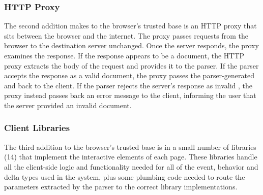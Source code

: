 \subsubsection{HTTP Proxy}
\label{future-web:implementation:proxy}
The second addition \CDF makes to the browser's trusted base is an HTTP proxy
that sits between the browser and the internet.  The proxy passes requests
from the browser to the destination server unchanged.  Once the server responds,
the proxy examines the response.  If the response appears to be a \CDF document,
the HTTP proxy extracts the body of the request and provides it to the parser.
If the parser accepts the response as a valid \CDF document, the proxy passes
the parser-generated \HTML and \JS back to the client.  If the parser rejects
the server's response as invalid \CDF, the proxy instead passes back an error
message to the client, informing the user that the server provided an invalid
document.
%
%
%
\subsubsection{Client \JS Libraries}
\label{future-web:implementation:client-js}
The third addition to the browser's trusted base is in a small number of
\JS libraries (14) that implement the interactive elements of each
page.  These libraries handle all the client-side logic and functionality
needed for all of the event, behavior and delta types used in the system,
plus some plumbing code needed to route the parameters extracted by the
parser to the correct library implementations.
%
